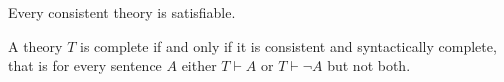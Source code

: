 \begin{page}

\begin{thm}
\label{thm:Complete2}
Every consistent theory is satisfiable.
\end{thm}

\end{page}

\begin{page}

\begin{cor}
A theory $T$ is complete if and only if it is consistent and syntactically complete,
that is for every sentence $A$ either $T \vdash A$ or $T \vdash \neg A$ but not both.
\end{cor}

\end{page}

